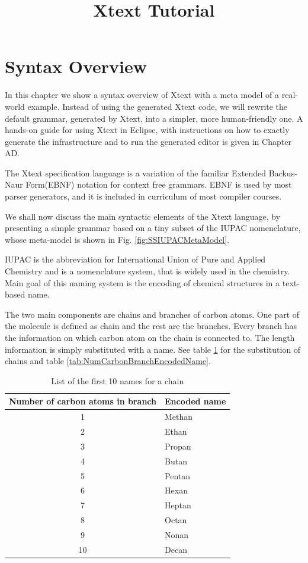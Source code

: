 \documentclass[a4paper,10pt]{article}
\title{Xtext Tutorial}
\author{}
\newcommand{\gerquot}[1]{\glqq#1\grqq}
\newcommand{\IUPAC}{International Union of Pure and Applied Chemistry}
\newcommand{\EBNF}{Extended Backus-Naur Form}
\newcommand{\captionVSpace}{\vspace*{-0.05cm}}
\begin{document}
\maketitle

\section{Syntax Overview}
In this chapter we show a syntax overview of Xtext with a meta model of a real-world example. Instead of using the generated Xtext code, we will rewrite the default grammar, generated by Xtext, into a simpler, more human-friendly one. A hands-on guide for using Xtext in Eclipse, with instructions on how to exactly generate the infrastructure and to run the generated editor is given in Chapter AD.

The Xtext specification language is a variation of the familiar \EBNF\space(EBNF) notation for context free grammars. EBNF is used by most parser generators, and it is included in curriculum of most compiler courses.

We shall now discuss the main syntactic elements of the Xtext language, by presenting a simple grammar based on a tiny subset of the IUPAC nomenclature, whose meta-model is shown in Fig. \ref{fig:SSIUPACMetaModel}.

\gerquot{IUPAC} is the abbreviation for \gerquot{\IUPAC} and is a nomenclature system, that is widely used in the chemistry. Main goal of this naming system is the encoding of chemical structures in a text-based name.

The two main components are chains and branches of carbon atoms. One part of the molecule is defined as chain and the rest are the branches. Every branch has the information on which carbon atom on the chain is connected to. The length information is simply substituted with a name. See table \ref{tab:NumCarbonChainEncodedName} for the substitution of chains and table \ref{tab:NumCarbonBranchEncodedName}.

\begin{table}[H]
    \centering
    \begin{tabular}{c|l}
        \toprule
        \textbf{Number of carbon atoms in branch} & \textbf{Encoded name} \\
        \midrule
        1 & Methan \\
        2 & Ethan \\
        3 & Propan \\
        4 & Butan \\
        5 & Pentan \\
        6 & Hexan \\
        7 & Heptan \\
        8 & Octan \\
        9 & Nonan \\
        10 & Decan \\
        \bottomrule
    \end{tabular}
    \captionVSpace
    \caption{List of the first 10 names for a chain}
    \label{tab:NumCarbonChainEncodedName}
\end{table}
\end{document}
